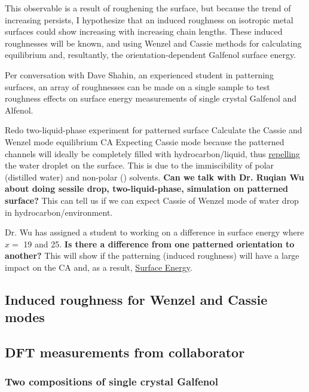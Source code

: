 \begin{outline}[enumerate]
	This observable \ca is a result of roughening the surface, but because the trend of increasing \ca persists, I hypothesize that an induced roughness on isotropic metal surfaces could show increasing \ca[s] with increasing \nalk chain lengths. These induced roughnesses will be known, and using Wenzel\cite{Wenzel1936,Wenzel1949a} and Cassie\cite{Cassie1944} methods for calculating equilibrium \ca[s] and, resultantly, the orientation-dependent Galfenol surface energy. 
		
	\2 Per conversation with Dave Shahin, an experienced student in patterning surfaces, an array of roughnesses can be made on a single sample to test roughness effects on surface energy measurements of single crystal Galfenol and Alfenol. 
	
\1 Redo two-liquid-phase experiment for patterned surface
	\2 Calculate the Cassie and Wenzel mode equilibrium CA
		\3 Expecting Cassie mode because the patterned channels will ideally be completely filled with hydrocarbon/\nalk liquid, thus \underline{repelling} the water droplet on the surface. This is due to the immiscibility of polar (distilled water) and non-polar (\nalk) solvents. 
			\4 \textbf{Can we talk with Dr. Ruqian Wu about doing sessile drop, two-liquid-phase, simulation on patterned surface?} This can tell us if we can expect Cassie of Wenzel mode of water drop in hydrocarbon/\nalk environment. 
			
			\4 Dr. Wu has assigned a student to working on a difference in \fegacomp surface energy where $x =$ 19 and 25.
	\2 \textbf{Is there a difference from one patterned orientation to another?}
		\3 This will show if the patterning (induced roughness) will have a large impact on the CA and, as a result, \underline{Surface Energy}. 
\end{outline}

\subsection{Induced roughness for Wenzel and Cassie modes}

\subsection{DFT measurements from collaborator}
\subsubsection{Two compositions of single crystal Galfenol}
